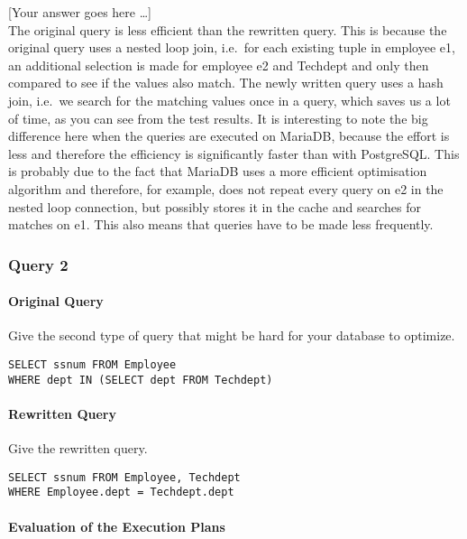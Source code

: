 \documentclass[11pt]{scrartcl}
\newcommand{\youranswerhere}{[Your answer goes here \ldots]}
\begin{document}
    \youranswerhere{} \\
    The original query is less efficient than the rewritten query.
    This is because the original query uses a nested loop join, i.e.\ for each existing tuple in employee e1, an additional selection is made for employee e2 and Techdept and only then compared to see if the values also match.
    The newly written query uses a hash join, i.e.\ we search for the matching values once in a query, which saves us a lot of time, as you can see from the test results. \newline
    It is interesting to note the big difference here when the queries are executed on MariaDB, because the effort is less and therefore the efficiency is significantly faster than with PostgreSQL\@.
    This is probably due to the fact that MariaDB uses a more efficient optimisation algorithm and therefore, for example, does not repeat every query on e2 in the nested loop connection, but possibly stores it in the cache and searches for matches on e1.
    This also means that queries have to be made less frequently.

    \subsubsection*{Query 2}

    \paragraph{Original Query}

    Give the second type of query that might be hard for your database to optimize.

    \begin{lstlisting}[style=dbtsql]
SELECT ssnum FROM Employee
WHERE dept IN (SELECT dept FROM Techdept)
    \end{lstlisting}

    \paragraph{Rewritten Query}

    Give the rewritten query.

    \begin{lstlisting}[style=dbtsql]
SELECT ssnum FROM Employee, Techdept
WHERE Employee.dept = Techdept.dept
    \end{lstlisting}

    \paragraph{Evaluation of the Execution Plans}
\end{document}
